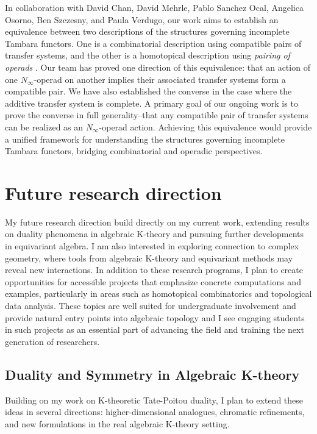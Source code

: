 \documentclass[11pt]{article}
\begin{document}
In collaboration with David Chan, David Mehrle, Pablo Sanchez Ocal, Angelica Osorno, Ben Szczesny, and Paula Verdugo, our work aims to establish an equivalence between two descriptions of the structures governing incomplete Tambara functors. 
One is a combinatorial description using compatible pairs of transfer systems, and the other is a homotopical description using {\it pairing of operads} \cite{MR2544392}. Our team has proved one direction of this equivalence: that an action of one $N_\infty$-operad on another implies their associated transfer systems form a compatible pair. 
We have also established the converse in the case where the additive transfer system is complete. A primary goal of our ongoing work is to prove the converse in full generality--that any compatible pair of transfer systems can be realized as an $N_\infty$-operad action. Achieving this equivalence would provide a unified framework for understanding the structures governing incomplete Tambara functors, bridging combinatorial and operadic perspectives.


\section{Future research direction}

My future research direction build directly on my current work, extending results on duality phenomena in algebraic K-theory and pursuing further developments in equivariant algebra.
I am also interested in exploring connection to complex geometry, where tools from algebraic K-theory and equivariant methods may reveal new interactions.
In addition to these research programs, I plan to create opportunities for accessible projects that emphasize concrete computations and examples, particularly in areas such as homotopical combinatorics and topological data analysis.
These topics are well suited for undergraduate involvement and provide natural entry points into algebraic topology and I see engaging students in such projects as an essential part of advancing the field and training the next generation of researchers.

\subsection*{Duality and Symmetry in Algebraic K-theory}
Building on my work on K-theoretic Tate-Poitou duality, I plan to extend these ideas in several directions: higher-dimensional analogues, chromatic refinements, and new formulations in the real algebraic K-theory setting.
\end{document}
